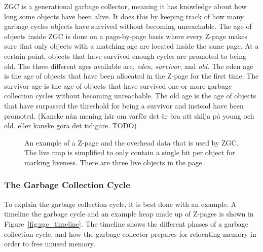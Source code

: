 \begin{description}
        ZGC is a generational garbage collector, meaning it has knowledge about how long some objects have been alive. It does this by keeping track of how many garbage cycles objects have survived without becoming unreachable. The age of objects inside ZGC is done on a page-by-page basis where every Z-page makes sure that only objects with a matching age are located inside the same page. At a certain point, objects that have survived enough cycles are promoted to being old. The three different ages available are, \textit{eden}, \textit{survivor}, and \textit{old}. The eden age is the age of objects that have been allocated in the Z-page for the first time. The survivor age is the age of objects that have survived one or more garbage collection cycles without becoming unreachable. The old age is the age of objects that have surpassed the threshold for being a survivor and instead have been promoted. (Kanske nån mening här om varför det är bra att skilja på young och old. eller kanske göra det tidigare. TODO)
\end{description}

\begin{figure}[H]
    \centering
    
    \caption[]
    {An example of a Z-page and the overhead data that is used by ZGC. The live map is simplified to only contain a single bit per object for marking liveness. There are three live objects in the page.} 
    \label{fig:zpages}
\end{figure}

\subsubsection{The Garbage Collection Cycle}
To explain the garbage collection cycle, it is best done with an example. A timeline the garbage cycle and an example heap made up of Z-pages is shown in Figure~\ref{fig:zgc_timeline}. The timeline shows the different phases of a garbage collection cycle, and how the garbage collector prepares for relocating memory in order to free unused memory.

